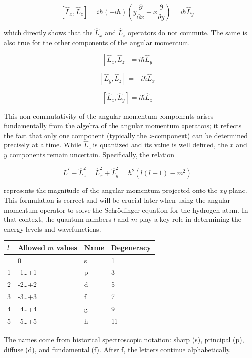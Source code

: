 \documentclass[
  a4paper,
]{book}
\begin{document}
\[[\hat{L}_x,\hat{L}_z] = i\hbar(-i\hbar)\left(y\frac{\partial}{\partial x} - x\frac{\partial}{\partial y}\right) = i\hbar \hat{L}_y\]

which directly shows that the \(\hat{L}_x\) and \(\hat{L}_z\) operators
do not commute. The same is also true for the other components of the
angular momentum.

\[
\left[ \hat{L}_x, \hat{L}_z \right] = i\hbar \hat{L}_y
\]

\[
\left[ \hat{L}_y, \hat{L}_z \right] = -i\hbar \hat{L}_x
\]

\[
\left[ \hat{L}_x, \hat{L}_y \right] = i\hbar \hat{L}_z
\]

This non-commutativity of the angular momentum components arises
fundamentally from the algebra of the angular momentum operators; it
reflects the fact that only one component (typically the
\(z\)-component) can be determined precisely at a time. While
\(\hat{L}_z\) is quantized and its value is well defined, the \(x\) and
\(y\) components remain uncertain. Specifically, the relation

\[
\hat{L}^2-\hat{L}_z^2 = \hat{L}_x^2 + \hat{L}_y^2 = \hbar^2 \left(l(l+1)-m^2\right)
\]

represents the magnitude of the angular momentum projected onto the
\(xy\)-plane. This formulation is correct and will be crucial later when
using the angular momentum operator to solve the Schrödinger equation
for the hydrogen atom. In that context, the quantum numbers \(l\) and
\(m\) play a key role in determining the energy levels and
wavefunctions.

\begin{tcolorbox}[enhanced jigsaw, coltitle=black, title=\textcolor{quarto-callout-note-color}{\faInfo}\hspace{0.5em}{Quantization and degeneracy of angular momentum}, colframe=quarto-callout-note-color-frame, toprule=.15mm, opacitybacktitle=0.6, left=2mm, opacityback=0, breakable, toptitle=1mm, bottomtitle=1mm, leftrule=.75mm, arc=.35mm, titlerule=0mm, colbacktitle=quarto-callout-note-color!10!white, rightrule=.15mm, bottomrule=.15mm, colback=white]

\begin{longtable}[]{@{}llll@{}}
\toprule\noalign{}
\(l\) & Allowed \(m\) values & Name & Degeneracy \\
\midrule\noalign{}
\endhead
\bottomrule\noalign{}
\endlastfoot
0 & 0 & s & 1 \\
1 & -1\ldots+1 & p & 3 \\
2 & -2\ldots+2 & d & 5 \\
3 & -3\ldots+3 & f & 7 \\
4 & -4\ldots+4 & g & 9 \\
5 & -5\ldots+5 & h & 11 \\
\end{longtable}

The names come from historical spectroscopic notation: sharp (s),
principal (p), diffuse (d), and fundamental (f). After f, the letters
continue alphabetically.

\end{tcolorbox}
\end{document}
